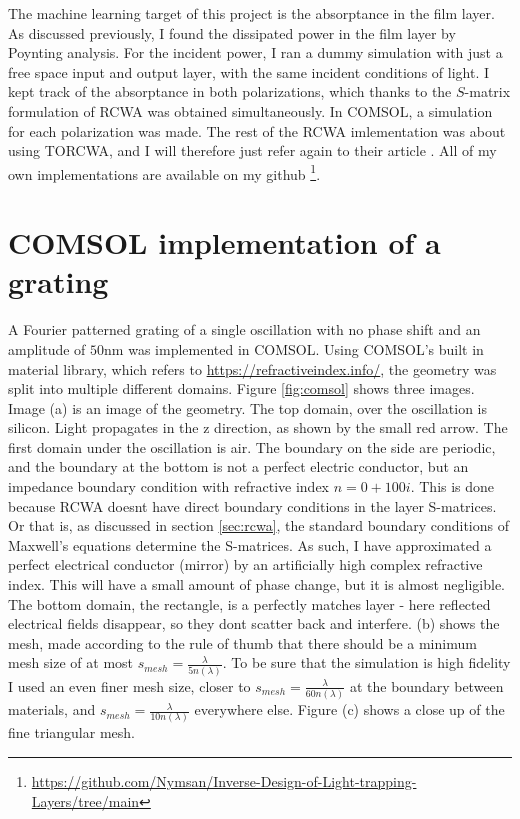 The machine learning target of this project is the absorptance in the film layer. As discussed previously, I found the dissipated power in the film layer by Poynting analysis. For the incident power, I ran a dummy simulation with just a free space input and output layer, with the same incident conditions of light. I kept track of the absorptance in both polarizations, which thanks to the $S$-matrix formulation of RCWA was obtained simultaneously. In COMSOL, a simulation for each polarization was made.
The rest of the RCWA imlementation was about using TORCWA, and I will therefore just refer again to their article \cite{torcwa}.
All of my own implementations are available on my github \footnote{\url{https://github.com/Nymsan/Inverse-Design-of-Light-trapping-Layers/tree/main}}.

\section{COMSOL implementation of a grating}
\label{sec:comsol}
A Fourier patterned grating of a single oscillation with no phase shift and an amplitude of $50\text{nm}$ was implemented in COMSOL. Using COMSOL's built in material library, which refers to \url{https://refractiveindex.info/}, the geometry was split into multiple different domains.
Figure \ref{fig:comsol} shows three images. Image (a) is an image of the geometry. The top domain, over the oscillation is silicon. Light propagates in the z direction, as shown by the small red arrow. The first domain under the oscillation is air. The boundary on the side are periodic, and the boundary at the bottom is not a perfect electric conductor, but an impedance boundary condition with refractive index $n = 0 + 100i$. This is done because RCWA doesnt have direct boundary conditions in the layer S-matrices. Or that is, as discussed in section \ref{sec:rcwa}, the standard boundary conditions of Maxwell's equations determine the S-matrices.
As such, I have approximated a perfect electrical conductor (mirror) by an artificially high complex refractive index. This will have a small amount of phase change, but it is almost negligible. The bottom domain, the rectangle, is a perfectly matches layer - here reflected electrical fields disappear, so they dont scatter back and interfere.
(b) shows the mesh, made according to the rule of thumb that there should be a minimum mesh size of at most $s_{mesh} = \frac{\lambda}{5n(\lambda)}$. To be sure that the simulation is high fidelity I used an even finer mesh size, closer to $s_{mesh} = \frac{\lambda}{60n(\lambda)}$ at the boundary between materials, and $s_{mesh} = \frac{\lambda}{10n(\lambda)}$ everywhere else. Figure (c) shows a close up of the fine triangular mesh.

